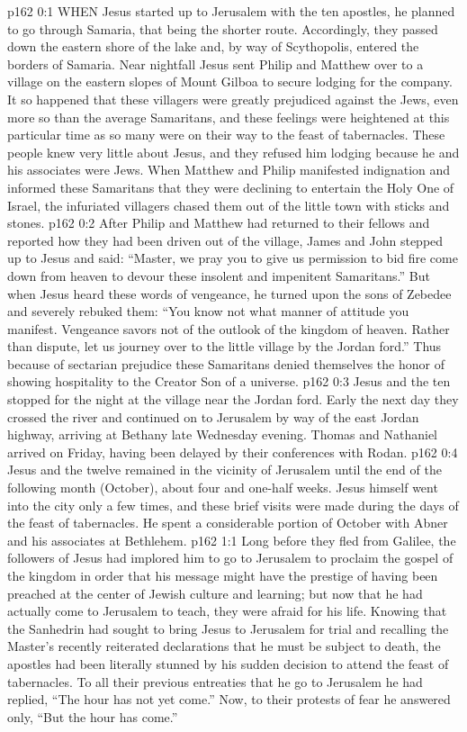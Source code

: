 \vs p162 0:1 WHEN Jesus started up to Jerusalem with the ten apostles, he planned to go through Samaria, that being the shorter route. Accordingly, they passed down the eastern shore of the lake and, by way of Scythopolis, entered the borders of Samaria. Near nightfall Jesus sent Philip and Matthew over to a village on the eastern slopes of Mount Gilboa to secure lodging for the company. It so happened that these villagers were greatly prejudiced against the Jews, even more so than the average Samaritans, and these feelings were heightened at this particular time as so many were on their way to the feast of tabernacles. These people knew very little about Jesus, and they refused him lodging because he and his associates were Jews. When Matthew and Philip manifested indignation and informed these Samaritans that they were declining to entertain the Holy One of Israel, the infuriated villagers chased them out of the little town with sticks and stones.
\vs p162 0:2 After Philip and Matthew had returned to their fellows and reported how they had been driven out of the village, James and John stepped up to Jesus and said: “Master, we pray you to give us permission to bid fire come down from heaven to devour these insolent and impenitent Samaritans.” But when Jesus heard these words of vengeance, he turned upon the sons of Zebedee and severely rebuked them: \textcolor{ubdarkred}{“You know not what manner of attitude you manifest. Vengeance savors not of the outlook of the kingdom of heaven. Rather than dispute, let us journey over to the little village by the Jordan ford.”} Thus because of sectarian prejudice these Samaritans denied themselves the honor of showing hospitality to the Creator Son of a universe.
\vs p162 0:3 Jesus and the ten stopped for the night at the village near the Jordan ford. Early the next day they crossed the river and continued on to Jerusalem by way of the east Jordan highway, arriving at Bethany late Wednesday evening. Thomas and Nathaniel arrived on Friday, having been delayed by their conferences with Rodan.
\vs p162 0:4 \pc Jesus and the twelve remained in the vicinity of Jerusalem until the end of the following month (October), about four and one\hyp{}half weeks. Jesus himself went into the city only a few times, and these brief visits were made during the days of the feast of tabernacles. He spent a considerable portion of October with Abner and his associates at Bethlehem.
\vs p162 1:1 Long before they fled from Galilee, the followers of Jesus had implored him to go to Jerusalem to proclaim the gospel of the kingdom in order that his message might have the prestige of having been preached at the center of Jewish culture and learning; but now that he had actually come to Jerusalem to teach, they were afraid for his life. Knowing that the Sanhedrin had sought to bring Jesus to Jerusalem for trial and recalling the Master’s recently reiterated declarations that he must be subject to death, the apostles had been literally stunned by his sudden decision to attend the feast of tabernacles. To all their previous entreaties that he go to Jerusalem he had replied, \textcolor{ubdarkred}{“The hour has not yet come.”} Now, to their protests of fear he answered only, \textcolor{ubdarkred}{“But the hour has come.”}
